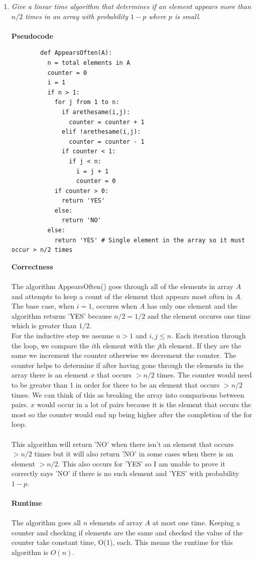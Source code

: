 \documentclass[12pt]{article}
\begin{document}
\begin{enumerate}
        \newpage
		\item \textit{Give a linear time algorithm that determines if an 
		element appears more than $n/2$ times in an array with probability $1-p$ where $p$ is small.}\\
		\\
		\textbf{Pseudocode}
		\begin{verbatim}
		def AppearsOften(A):
		  n = total elements in A
		  counter = 0
		  i = 1
		  if n > 1:
		    for j from 1 to n:
		      if arethesame(i,j):
		        counter = counter + 1
		      elif !arethesame(i,j):
		        counter = counter - 1
		      if counter < 1:
		        if j < n:
		          i = j + 1
		          counter = 0
		    if counter > 0:
		      return 'YES'
		    else:
		      return 'NO'
		  else:
		    return 'YES' # Single element in the array so it must occur > n/2 times
		\end{verbatim}
		\textbf{Correctness}\\
		\\
		The algorithm AppearsOften() goes through all of the elements in array $A$ and attempts to keep a count of the
		element that appears most often in $A$.  The base case, when $i = 1$, occures when $A$ has only one element and the algorithm returns 'YES' because $n/2 = 1/2$ and the element occures one time which is greater than $1/2$.
		\\
		For the inductive step we assume $n > 1$ and $i,j \le n$.  Each iteration through the loop, we compare the $i$th element with the $j$th element.  If they are the same we increment the counter otherwise we decrement the counter.  The counter helps to determine if after having gone through the elements in the array there is an element $x$ that occurs $> n/2$ times.  The counter would need to be greater than 1 in order for there to be an element that occurs $> n/2$ times.  We can think of this as breaking the array into comparisons between pairs.  $x$ would occur in a lot of pairs because it is the element that occurs the most so the counter would end up being higher after the completion of the for loop.\\
		\\
		This algorithm will return 'NO' when there isn't an element that occurs $> n/2$ times but it will also return 'NO' in some cases when there is an element $> n/2$.  This also occurs for 'YES' so I am unable to prove it correctly says 'NO' if there is no such element and 'YES' with probability $1-p$.\\      
		\\
		\textbf{Runtime}\\
		\\
		The algorithm goes all $n$ elements of array $A$ at most one time.  
		Keeping a counter and checking if elements are the 
		same and checked the value of the counter take constant time, O(1), each.
		This means the runtime for this algorithm is $O(n)$.
		

\end{enumerate}
\end{document}
